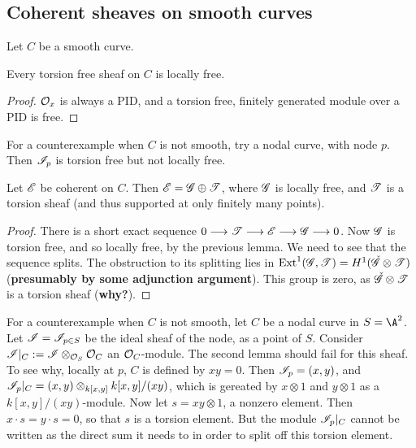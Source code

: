 \documentclass[11pt]{article}
\begin{document}
\subsection*{Coherent sheaves on smooth curves}
Let $C$ be a smooth curve.
\begin{lem*}
Every torsion free sheaf on $C$ is locally free.
\end{lem*}
\begin{proof}
$\mathcal{O}_x$ is always a PID, and a torsion free, finitely generated module over a
PID is free.
\end{proof}
\noindent
For a counterexample when $C$ is not smooth, try a nodal curve, with node $p$.
Then $\mathscr{I}_p$ is torsion free but not locally free.
\begin{lem*}
Let $\mathscr{E}$ be coherent on $C$. Then $\mathscr{E}=\mathscr{G}\oplus\mathscr{T}$, where $\mathscr{G}$ is
locally free, and $\mathscr{T}$ is a torsion sheaf (and thus supported at only
finitely many points).
\end{lem*}
\begin{proof}
There is a short exact sequence $0\longrightarrow \mathscr{T}\longrightarrow\mathscr{E}\longrightarrow\mathscr{G}\longrightarrow0$. Now $\mathscr{G}$ is
torsion free, and so locally free, by the previous lemma. We need to see that
the sequence splits. The obstruction to its splitting lies in
$\operatorname{Ext}^1(\mathscr{G},\mathscr{T})=H^1(\check{\mathscr{G}}\otimes\mathscr{T})$ (\textbf{presumably by some
adjunction argument}). This group is zero, as $\check{\mathscr{G}}\otimes\mathscr{T}$ is a
torsion sheaf (\textbf{why?}).
\end{proof}
\noindent For a counterexample when $C$ is not smooth, let $C$ be a nodal curve
in $S=\A^2$. Let $\mathscr{I}=\mathscr{I}_{p\in S}$ be the ideal sheaf of the node, as a
point of $S$. Consider $\mathscr{I}|_C:=\mathscr{I}\otimes_{\mathcal{O}_S}\mathcal{O}_C$ an
$\mathcal{O}_C$-module. The second lemma should fail for this sheaf. To see why,
locally at $p$, $C$ is defined by $xy=0$. Then $\mathscr{I}_p=(x,y)$, and
$\mathscr{I}_p|_C=(x,y)\otimes_{k[x,y]}k[x,y]/(xy)$, which is gereated by $x\otimes1$
and $y\otimes1$ as a $k[x,y]/(xy)$-module. Now let $s=xy\otimes1$, a nonzero
element. Then $x\cdot s=y\cdot s=0$, so that $s$ is a torsion element. But the
module $\mathscr{I}_p|_C$ cannot be written as the direct sum it needs to in order to
split off this torsion element.
\end{document}
